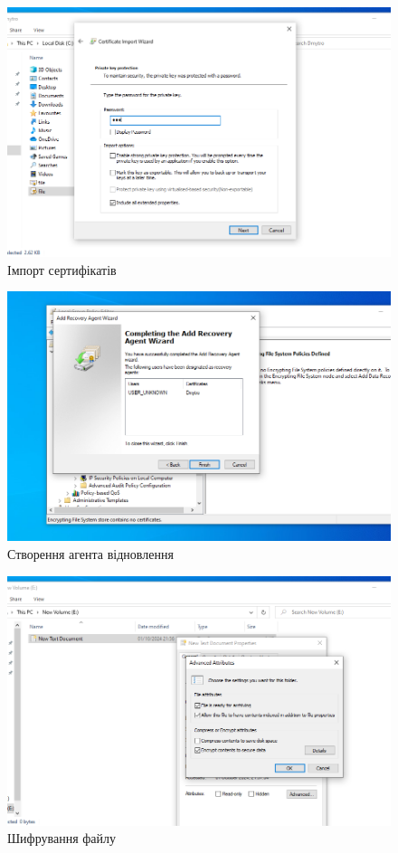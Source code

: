 \documentclass[oneside,14pt]{extarticle}
\begin{document}
\begin{normalsize}
	\begin{figure}[H]
		\centering
		\includegraphics[width=\columnwidth]{15}
		\caption{Імпорт сертифікатів}
	\end{figure}
	
	\begin{figure}[H]
		\centering
		\includegraphics[width=\columnwidth]{16}
		\caption{Створення агента відновлення}
	\end{figure}
	
	\begin{figure}[H]
		\centering
		\includegraphics[width=\columnwidth]{17}
		\caption{Шифрування файлу}
	\end{figure}
	

\end{normalsize}
\end{document}
